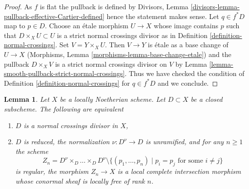 \documentclass{stacks-project}
\theoremstyle{plain}
\newtheorem{lemma}[subsection]{Lemma}
\theoremstyle{definition}
\theoremstyle{remark}
\numberwithin{equation}{subsection}
\begin{document}
\begin{proof}
As $f$ is flat the pullback is defined by
Divisors, Lemma \ref{divisors-lemma-pullback-effective-Cartier-defined}
hence the statement makes sense.
Let $q \in f^*D$ map to $p \in D$.
Choose an \'etale morphism $U \to X$ whose image contains $p$
such that $D \times_X U \subset U$ is a strict normal crossings
divisor as in Definition \ref{definition-normal-crossings}.
Set $V = Y \times_X U$. Then $V \to Y$ is \'etale as a base
change of $U \to X$
(Morphisms, Lemma \ref{morphisms-lemma-base-change-etale})
and the pullback $D \times_X V$ is a strict normal crossings
divisor on $V$ by Lemma \ref{lemma-smooth-pullback-strict-normal-crossings}.
Thus we have checked the condition of
Definition \ref{definition-normal-crossings}
for $q \in f^*D$ and we conclude.
\end{proof}

\begin{lemma}
\label{lemma-characterize-normal-crossings-normalization}
Let $X$ be a locally Noetherian scheme. Let $D \subset X$ be a closed
subscheme. The following are equivalent
\begin{enumerate}
\item $D$ is a normal crossings divisor in $X$,
\item $D$ is reduced, the normalization $\nu : D^\nu \to D$ is unramified,
and for any $n \geq 1$ the scheme
$$
Z_n = D^\nu \times_D \ldots \times_D D^\nu
\setminus \{(p_1, \ldots, p_n) \mid p_i = p_j\text{ for some }i\not = j\}
$$
is regular, the morphism $Z_n \to X$ is a local complete intersection
morphism whose conormal sheaf is locally free of rank $n$.
\end{enumerate}
\end{lemma}
\end{document}
